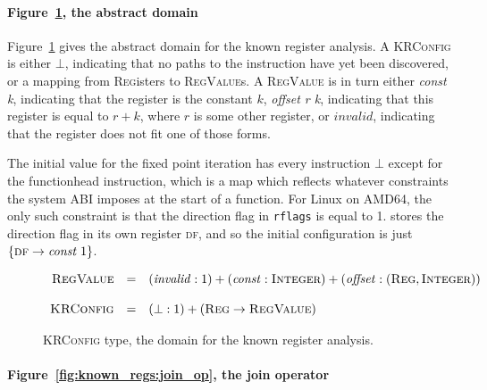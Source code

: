 
\paragraph{Figure~\ref{fig:known_regs:configuration}, the abstract domain}

Figure~\ref{fig:known_regs:configuration} gives the abstract domain
for the known register analysis.  A \textsc{KRConfig} is either
$\bot$, indicating that no paths to the instruction have yet been
discovered, or a mapping from \textsc{Reg}isters to
\textsc{RegValue}s.  A \textsc{RegValue} is in turn either
\textit{const k}, indicating that the register is the constant $k$,
\textit{offset r k}, indicating that this register is equal to $r +
k$, where $r$ is some other register, or $\mathit{invalid}$,
indicating that the register does not fit one of those forms.

The initial value for the fixed point iteration has every instruction
$\bot$ except for the \gls{functionhead} instruction, which is a map
which reflects whatever constraints the system ABI imposes at the
start of a function.  For Linux on AMD64, the only such constraint is
that the direction flag in \texttt{rflags} is equal to
1.  {\Implementation} stores the direction
flag in its own register \textsc{df}, and so the initial configuration
is just $\{ \textsc{df} \rightarrow \textit{const }1 \}$.

\begin{figure}
  \begin{displaymath}
    \begin{array}{rcl}
      \textsc{RegValue} & = & (\mathit{invalid}:1) + (\mathit{const}:\textsc{Integer}) + (\mathit{offset}:\left(\textsc{Reg}, \textsc{Integer}\right)) \\
      \\
      \textsc{KRConfig} & = & ({\bot}:1) + (\textsc{Reg} \rightarrow \textsc{RegValue})\\
    \end{array}
  \end{displaymath}
  \caption{\textsc{KRConfig} type, the domain for the known register
    analysis.}
  \label{fig:known_regs:configuration}
\end{figure}

\paragraph{Figure~\ref{fig:known_regs:join_op}, the join operator}

